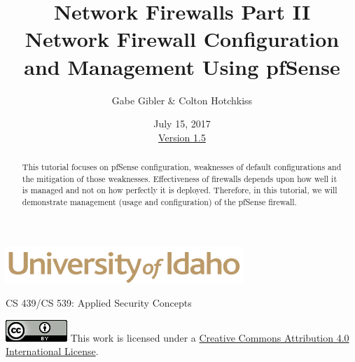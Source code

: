 \documentclass[12pt]{extarticle}
\begin{document}
\title{ Network Firewalls Part II\\ \normalsize Network Firewall Configuration and Management Using pfSense }
\author{Gabe Gibler \& Colton Hotchkiss }
\date{July 15, 2017 \\ \hyperref[changelog]{Version 1.5} }
\renewcommand{\abstractname}{Summary}
\begin{titlepage}
\maketitle
{}
\begin{center}
\includegraphics[scale=.5]{UofI}

\large{CS 439/CS 539: Applied Security Concepts}

\vskip 40pt

\end{center}
\begin{abstract}
This tutorial focuses on pfSense configuration, weaknesses of default configurations and the mitigation of those weaknesses. Effectiveness of firewalls depends upon how well it is managed and not on how perfectly it is deployed. Therefore, in this tutorial, we will demonstrate management (usage and configuration) of the pfSense firewall.
\end{abstract}


\vfill
\begin{center}
	\includegraphics[scale=0.5]{cc}
	\vskip 10pt
	This work is licensed under a \href{https://creativecommons.org/licenses/by/4.0/}{Creative Commons Attribution 4.0 International License}.
\end{center}

\end{titlepage}


\pagebreak
\tableofcontents


\pagebreak
{}
\setcounter{section}{1}
\end{document}
